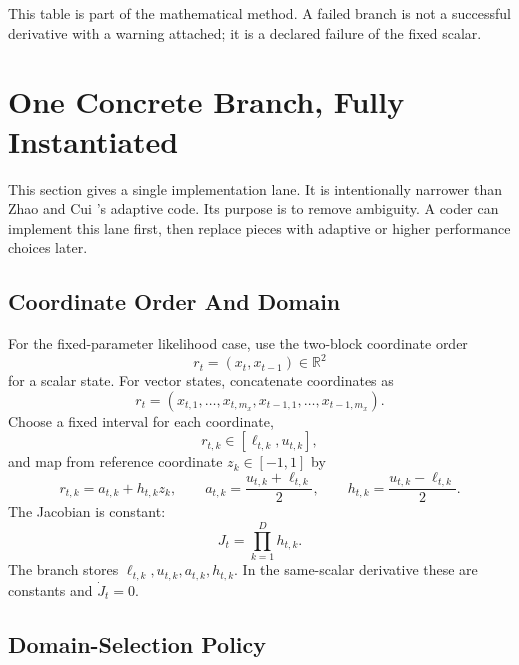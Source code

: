 \documentclass[11pt]{article}
\numberwithin{equation}{section}
\newcommand{\R}{\mathbb R}
\begin{document}
This table is part of the mathematical method.  A failed branch is not a
successful derivative with a warning attached; it is a declared failure of the
fixed scalar.

\section{One Concrete Branch, Fully Instantiated}

This section gives a single implementation lane.  It is intentionally narrower
than Zhao and Cui \cite{zhao2024ttsequential}'s adaptive code.  Its purpose is to remove ambiguity.  A coder
can implement this lane first, then replace pieces with adaptive or higher
performance choices later.

\subsection{Coordinate Order And Domain}

For the fixed-parameter likelihood case, use the two-block coordinate order
\[
    r_t=(x_t,x_{t-1})\in\R^2
\]
for a scalar state.  For vector states, concatenate coordinates as
\[
    r_t=(x_{t,1},\ldots,x_{t,m_x},x_{t-1,1},\ldots,x_{t-1,m_x}).
\]
Choose a fixed interval for each coordinate,
\[
    r_{t,k}\in[\ell_{t,k},u_{t,k}],
\]
and map from reference coordinate \(z_k\in[-1,1]\) by
\begin{equation}
    r_{t,k}=a_{t,k}+h_{t,k}z_k,\qquad
    a_{t,k}=\frac{u_{t,k}+\ell_{t,k}}2,\qquad
    h_{t,k}=\frac{u_{t,k}-\ell_{t,k}}2.
    \label{eq:p24-c1}
\end{equation}
The Jacobian is constant:
\begin{equation}
    J_t=\prod_{k=1}^{D}h_{t,k}.
    \label{eq:p24-c2}
\end{equation}
The branch stores \(\ell_{t,k},u_{t,k},a_{t,k},h_{t,k}\).  In the same-scalar
derivative these are constants and \(\dot J_t=0\).

\subsection*{Domain-Selection Policy}
\end{document}
